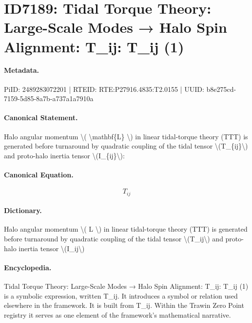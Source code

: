 \section*{ID7189: Tidal Torque Theory: Large-Scale Modes → Halo Spin Alignment: T\_ij: T\_ij (1)}
\paragraph{Metadata.}
PiID: 2489283072201 | RTEID: RTE:P27916.4835:T2.0155 | UUID: b8e275cd-7159-5d85-8a7b-a737a1a7910a

\paragraph{Canonical Statement.}
Halo angular momentum \textbackslash{}( \textbackslash{}mathbf\{L\} \textbackslash{}) in linear tidal-torque theory (TTT) is generated before turnaround by quadratic coupling of the tidal tensor \textbackslash{}(T\_\{ij\}\textbackslash{}) and proto-halo inertia tensor \textbackslash{}(I\_\{ij\}\textbackslash{}):

\paragraph{Canonical Equation.}
\[
T_{ij}
\]

\paragraph{Dictionary.}
Halo angular momentum \textbackslash{}( L \textbackslash{}) in linear tidal-torque theory (TTT) is generated before turnaround by quadratic coupling of the tidal tensor \textbackslash{}(T\_ij\textbackslash{}) and proto-halo inertia tensor \textbackslash{}(I\_ij\textbackslash{})

\paragraph{Encyclopedia.}
Tidal Torque Theory: Large-Scale Modes → Halo Spin Alignment: T\_ij: T\_ij (1) is a symbolic expression, written T\_ij. It introduces a symbol or relation used elsewhere in the framework. It is built from T\_ij. Within the Trawin Zero Point registry it serves as one element of the framework's mathematical narrative.
